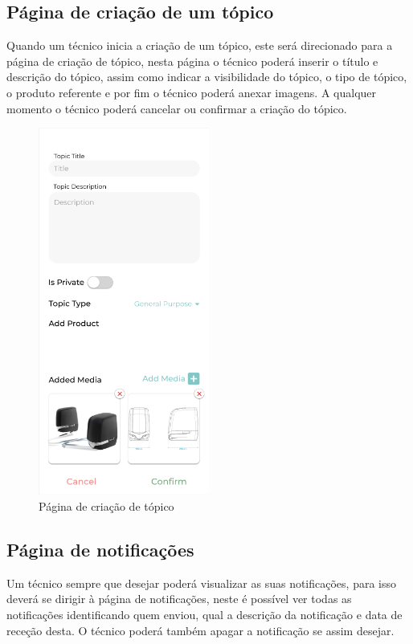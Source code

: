 \newpage

\subsection{Página de criação de um tópico}

Quando um técnico inicia a criação de um tópico, este será direcionado para a página de criação de tópico, 
nesta página o técnico poderá inserir o título e descrição do tópico, assim como indicar a visibilidade do 
tópico, o tipo de tópico, o produto referente e por fim o técnico poderá anexar imagens. 
A qualquer momento o técnico poderá cancelar ou confirmar a criação do tópico.

\begin{figure}[htb]
    \centering
    \includegraphics[width=0.5\textwidth]{images/mockups/forum_create_topic.png}
    \caption{Página de criação de tópico}
    \label{fig:21}
\end{figure}

\subsection{Página de notificações}

Um técnico sempre que desejar poderá visualizar as suas notificações, para isso deverá se dirigir à página
de notificações, neste é possível ver todas as notificações identificando quem enviou, qual a descrição da 
notificação e data de receção desta. O técnico poderá também apagar a notificação se assim desejar.

